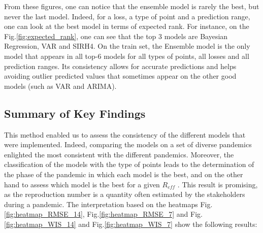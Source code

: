 From these figures, one can notice that the ensemble model is rarely the best, but never the last model. 
Indeed, for a loss, a type of point and a prediction range, one can look at the best model in terms of expected rank.
For instance, on the Fig.\ref{fig:expected_rank}, one can see that the top 3 models are Bayesian Regression, VAR and SIRH4. 
On the train set, the Ensemble model is the only model that appears in all top-6 models for all types of points, all losses and all prediction ranges.
Its consistency allows for accurate predictions and helps avoiding outlier predicted values that sometimes appear on the other good models (such as VAR and ARIMA). 



\subsection{Summary of Key Findings}

This method enabled us to assess the consistency of the different models that were implemented. 
Indeed, comparing the models on a set of diverse pandemics enlighted the most consistent with the different pandemics.
Moreover, the classification of the models with the type of points leads to the determination of the phase of the pandemic in which each model is the best, and on the other hand to assess which model is the best for a given $R_{eff}$ . 
This result is promising, as the reproduction number is a quantity often estimated by the stakeholders during a pandemic. 
The interpretation based on the heatmaps Fig.\ref{fig:heatmap_RMSE_14}, Fig.\ref{fig:heatmap_RMSE_7} and Fig.\ref{fig:heatmap_WIS_14} and Fig.\ref{fig:heatmap_WIS_7} show the following results: \\



